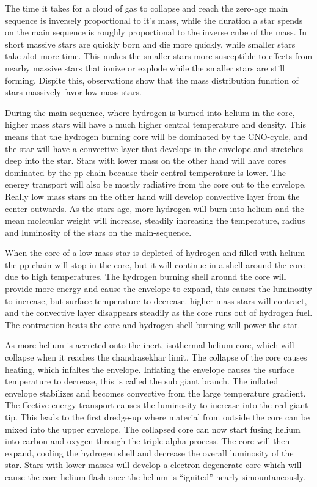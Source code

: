 The time it takes for a cloud of gas to collapse and reach the zero-age main sequence is inversely proportional to it's mass, while the duration a star spends on the main sequence is roughly proportional to the inverse cube of the mass.
In short massive stars are quickly born and die more quickly, while smaller stars take alot more time. This makes the smaller stars more susceptible to effects from nearby massive stars that ionize or explode while the smaller stars are still forming.
Dispite this, observations show that the mass distribution function of stars massively favor low mass stars.


During the main sequence, where hydrogen is burned into helium in the core, higher mass stars will have a much higher central temperature and density. This means that the hydrogen burning core will be dominated by the CNO-cycle, and the star will have a convective layer that develops in the envelope and stretches deep into the star.
Stars with lower mass on the other hand will have cores dominated by the pp-chain because their central temperature is lower. The energy transport will also be mostly radiative from the core out to the envelope.
Really low mass stars on the other hand will develop convective layer from the center outwards.
As the stars age, more hydrogen will burn into helium and the mean molecular weight will increase, steadily increasing the temperature, radius and luminosity of the stars on the main-sequence.

When the core of a low-mass star is depleted of hydrogen and filled with helium the pp-chain will stop in the core, but it will continue in a shell around the core due to high temperatures. The hydrogen burning shell around the core will provide more energy and cause the envelope to expand, this causes the luminosity to increase, but surface temperature to decrease.
higher mass stars will contract, and the convective layer disappears steadily as the core runs out of hydrogen fuel. The contraction heats the core and hydrogen shell burning will power the star.

As more helium is accreted onto the inert, isothermal helium core, which will collapse when it reaches the chandrasekhar limit.
The collapse of the core causes heating, which infaltes the envelope. Inflating the envelope causes the surface temperature to decrease, this is called the sub giant branch. The inflated envelope stabilizes and becomes convective from the large temperature gradient. The ffective energy transport causes the luminosity to increase into the red giant tip.
This leads to the first dredge-up where material from outside the core can be mixed into the upper envelope.
The collapsed core can now start fusing helium into carbon and oxygen through the triple alpha process. The core will then expand, cooling the hydrogen shell and decrease the overall luminosity of the star. Stars with lower masses will develop a electron degenerate core which will cause the core helium flash once the helium is ``ignited'' nearly simountaneously.

